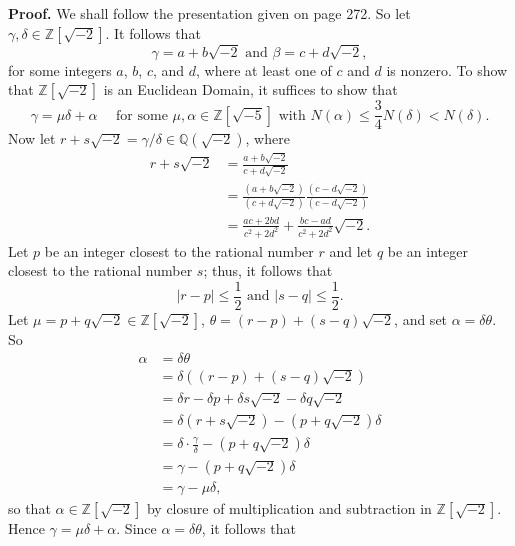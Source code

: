 \documentclass[9pt]{article}
\newcommand{\Z}{\mathbb{Z}}
\newcommand{\Q}{\mathbb{Q}}
\begin{document}
\begin{enumerate}
      \textbf{Proof.} We shall follow the presentation given on page 272. So
      let $\gamma, \delta \in \Z[\sqrt{-2}]$. It follows that
      $$\gamma = a + b\sqrt{-2} \text{ and } \beta = c + d\sqrt{-2},$$
      for some integers $a$, $b$, $c$, and $d$, where at least one of $c$ and
      $d$ is nonzero. To show that $\Z[\sqrt{-2}]$ is an Euclidean Domain, it
      suffices to show that
      $$\gamma = \mu\delta + \alpha \quad \text{ for some }\mu, \alpha \in
        \Z[\sqrt{-5}] \text{ with } N(\alpha) \le
        \frac{3}{4}N(\delta) < N(\delta).$$
      Now let $r + s\sqrt{-2} = \gamma/\delta \in \Q(\sqrt{-2})$, where
      \begin{align*}
         r + s\sqrt{-2} &= \frac{a + b\sqrt{-2}}{c + d\sqrt{-2}} \\
            &= \frac{(a + b\sqrt{-2})}{(c + d\sqrt{-2})}
               \frac{(c - d\sqrt{-2})}{(c - d\sqrt{-2})} \\
            &= \frac{ac+2bd}{c^2+2d^2} + \frac{bc-ad}{c^2+2d^2}\sqrt{-2}.
      \end{align*}
      Let $p$ be an integer closest to the rational number $r$ and let $q$ be an
      integer closest to the rational number $s$; thus, it follows that
      \begin{equation} \label{8_0}
         |r - p| \le \frac{1}{2} \text{ and } |s - q| \le \frac{1}{2}.
      \end{equation}
      Let $\mu = p + q\sqrt{-2} \in \Z[\sqrt{-2}]$,
      $\theta = (r - p) + (s - q)\sqrt{-2}$, and set
      $\alpha = \delta\theta$. So
      \begin{align*}
         \alpha &= \delta\theta \\
                &= \delta((r - p) + (s - q)\sqrt{-2}) \\
                &= \delta r - \delta p + \delta s\sqrt{-2} - \delta q\sqrt{-2} \\
                &= \delta(r + s\sqrt{-2}) - (p + q\sqrt{-2})\delta \\
                &= \delta \cdot \frac{\gamma}{\delta} - (p + q\sqrt{-2})\delta \\
                &= \gamma - (p + q\sqrt{-2})\delta \\
                &= \gamma - \mu\delta,
      \end{align*}
      so that $\alpha \in \Z[\sqrt{-2}]$ by closure of multiplication and
      subtraction in $\Z[\sqrt{-2}]$. Hence $\gamma = \mu\delta + \alpha$. Since
      $\alpha = \delta\theta$, it follows that
      \begin{align*}

\end{align*}
\end{enumerate}
\end{document}
